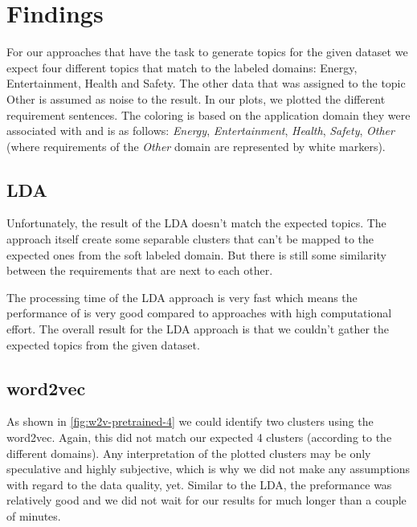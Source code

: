 \section{Findings} %
\label{sec:findings}

For our approaches that have the task to generate topics for the given dataset we expect four different topics that match to the labeled domains: Energy, Entertainment, Health and Safety. The other data that was assigned to the topic Other is assumed as noise to the result.
In our plots, we plotted the different requirement sentences. The coloring is based on the application domain they were associated with and is as follows: \textcolor{clr_energy}{\emph{Energy}}, \textcolor{clr_entertainment}{\emph{Entertainment}}, \textcolor{clr_health}{\emph{Health}}, \textcolor{clr_safety}{\emph{Safety}}, \emph{Other} (where requirements of the \emph{Other} domain are represented by white markers).

\subsection{LDA} %
\label{sub:findings_lda}

Unfortunately, the result of the LDA doesn't match the expected topics. The approach itself create some separable clusters that can't be mapped to the expected ones from the soft labeled domain. But there is still some similarity between the requirements that are next to each other.

The processing time of the LDA approach is very fast which means the performance of is very good compared to approaches with high computational effort. The overall result for the LDA approach is that we couldn't gather the expected topics from the given dataset.

\subsection{word2vec} %
\label{sub:findings_w2v}
As shown in \autoref{fig:w2v-pretrained-4} we could identify two clusters using the word2vec. Again, this did not match our expected 4 clusters (according to the different domains). Any interpretation of the plotted clusters may be only speculative and highly subjective, which is why we did not make any assumptions with regard to the data quality, yet.
Similar to the LDA, the preformance was relatively good and we did not wait for our results for much longer than a couple of minutes.

